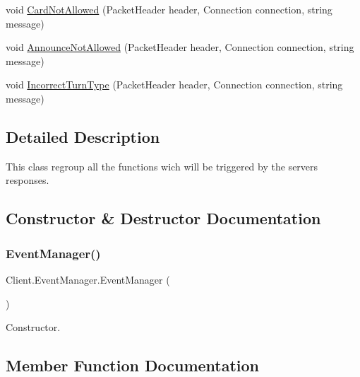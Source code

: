 \begin{DoxyCompactItemize}
\item 
void \hyperlink{class_client_1_1_event_manager_a9ba0ede549fb463f89022966a045a605}{Card\+Not\+Allowed} (Packet\+Header header, Connection connection, string message)
\item 
void \hyperlink{class_client_1_1_event_manager_a9750e931ce0003f953c3e62752c76413}{Announce\+Not\+Allowed} (Packet\+Header header, Connection connection, string message)
\item 
void \hyperlink{class_client_1_1_event_manager_ad5dbf05681ff2c9d265decf01bbecc50}{Incorrect\+Turn\+Type} (Packet\+Header header, Connection connection, string message)
\end{DoxyCompactItemize}


\subsection{Detailed Description}
This class regroup all the functions wich will be triggered by the server\textquotesingle{}s responses. 

\subsection{Constructor \& Destructor Documentation}
\mbox{\label{class_client_1_1_event_manager_afa1fe29f61e7329ba985dfb8c2627b36}} 
\subsubsection{\texorpdfstring{Event\+Manager()}{EventManager()}}
{\footnotesize\ttfamily Client.\+Event\+Manager.\+Event\+Manager (\begin{DoxyParamCaption}{ }\end{DoxyParamCaption})\hspace{0.3cm}{\ttfamily [inline]}}

Constructor. 

\subsection{Member Function Documentation}
\mbox{\label{class_client_1_1_event_manager_aa89e38b6c4951b76409d346715566695}} 
